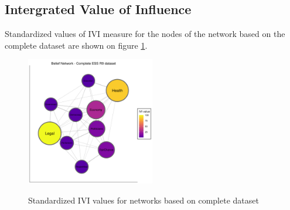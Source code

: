 \documentclass{article}
\begin{document}
\subsection{Intergrated Value of Influence}

Standardized values of IVI measure for the nodes of the network based on the complete dataset are shown on figure \ref{fig:ivifull}.

\begin{figure}[ht]
	\centering
	\includegraphics[width=0.5\textwidth]{figures/02-ivi-full.png}
	\label{fig:ivifull}
	\caption{Standardized IVI values for networks based on complete dataset}
\end{figure}
\end{document}
